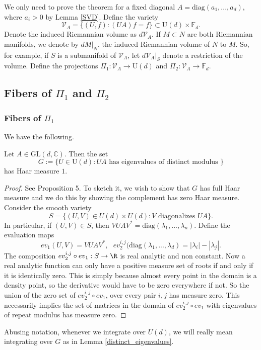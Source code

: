 \documentclass[10pt]{amsart}
\numberwithin{equation}{section}     %
\newcommand{\C}{\mathbb{C}}
\newcommand{\V}{\mathcal{V}}
\newcommand{\cV}{\mathcal{V}}\newcommand{\cW}{\mathcal{W}}\newcommand{\cX}{\mathcal{X}}
\newcommand{\FF}{\mathbb{F}}
\newcommand{\GL}{\mathrm{GL}}
\newcommand{\U}{\mathrm{U}}
\begin{document}
We only need to prove the theorem for a fixed diagonal $A = \mathrm{diag}(a_1,...,a_d)$, where $a_i > 0$ by Lemma \ref{SVD}. Define the variety $$\cV_A = \{(U,f): (UA)f = f\} \subset \U(d) \times \FF_d.$$ Denote the induced Riemannian volume as $d\cV_A$. If $M \subset N$ are both Riemannian manifolds, we denote by $dM|_N$, the induced Riemannian volume of $N$ to $M$. So, for example, if $S$ is a submanifold of $\cV_A$, let $d\cV_A|_{S}$ denote a restriction of the volume. Define the projections $\Pi_1: \V_A \to \U(d)$ and $\Pi_2: \V_A \to \FF_d$. 

\subsection{Fibers of $\Pi_1$ and $\Pi_2$}
\subsubsection{Fibers of $\Pi_1$} We have the following.
\begin{lemma} \label{distinct_eigenvalues}
    Let $A \in \GL(d,\C)$. Then the set $$G := \{U \in \U(d): UA \text{ has eigenvalues of distinct modulus } \}$$ has Haar measure $1.$
\end{lemma}

\begin{proof}
    See \cite{dedieu2003mike} Proposition 5. To sketch it, we wish to show that $G$ has full Haar measure and we do this by showing the complement has zero Haar measure. Consider the smooth variety $$S = \{ (U,V) \in U(d) \times U(d) : V \text{ diagonalizes } UA\}.$$ In particular, if $(U,V) \in S$, then $VUAV^* = \mathrm{diag}(\lambda_1,...,\lambda_n)$. Define the evaluation maps 
        $$ev_1(U,V) = VUAV^*, \ \ \ ev_2^{i,j}(\mathrm{diag}(\lambda_1,...,\lambda_d) = |\lambda_i| - |\lambda_j|.$$
 The composition $ev_2^{i,j} \circ ev_1 : S \to \R$ is real analytic and non constant. Now a real analytic function can only have a positive measure set of roots if and only if it is identically zero. This is simply because almost every point in the domain is a density point, so the derivative would have to be zero everywhere if not. So the union of the zero set of $ev_2^{i,j} \circ ev_1$, over every pair $i,j$ has measure zero. This necessarily implies the set of matrices in the domain of $ev_2^{i,j} \circ ev_1$ with eigenvalues of repeat modulus has measure zero. 
\end{proof}

Abusing notation, whenever we integrate over $U(d)$, we will really mean integrating over $G$ as in Lemma \ref{distinct_eigenvalues}.
\end{document}
